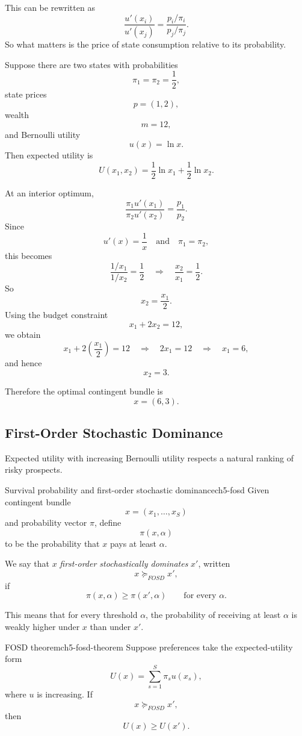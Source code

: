 This can be rewritten as
\[
\frac{u'(x_i)}{u'(x_j)} = \frac{p_i/\pi_i}{p_j/\pi_j}.
\]
So what matters is the price of state consumption relative to its probability.

\begin{examplebox}[title={Worked Example: optimal contingent consumption with logarithmic utility}]
Suppose there are two states with probabilities
\[
\pi_1=\pi_2=\frac12,
\]
state prices
\[
p=(1,2),
\]
wealth
\[
m=12,
\]
and Bernoulli utility
\[
u(x)=\ln x.
\]
Then expected utility is
\[
U(x_1,x_2)=\frac12 \ln x_1 + \frac12 \ln x_2.
\]

At an interior optimum,
\[
\frac{\pi_1 u'(x_1)}{\pi_2 u'(x_2)}=\frac{p_1}{p_2}.
\]
Since
\[
u'(x)=\frac{1}{x}
\quad \text{and} \quad
\pi_1=\pi_2,
\]
this becomes
\[
\frac{1/x_1}{1/x_2} = \frac{1}{2}
\quad \Longrightarrow \quad
\frac{x_2}{x_1}=\frac12.
\]
So
\[
x_2=\frac{x_1}{2}.
\]
Using the budget constraint
\[
x_1 + 2x_2 = 12,
\]
we obtain
\[
x_1 + 2\left(\frac{x_1}{2}\right)=12
\quad \Longrightarrow \quad
2x_1=12
\quad \Longrightarrow \quad
x_1=6,
\]
and hence
\[
x_2=3.
\]

Therefore the optimal contingent bundle is
\[
\boxed{x=(6,3).}
\]
\end{examplebox}

\subsection{First-Order Stochastic Dominance}

Expected utility with increasing Bernoulli utility respects a natural ranking of risky prospects.

\begin{definition}{Survival probability and first-order stochastic dominance}{ch5-fosd}
Given contingent bundle
\[
x=(x_1,\dots,x_S)
\]
and probability vector $\pi$, define
\[
\pi(x,\alpha)
\]
to be the probability that $x$ pays at least $\alpha$.

We say that $x$ \emph{first-order stochastically dominates} $x'$, written
\[
x \succeq_{FOSD} x',
\]
if
\[
\pi(x,\alpha) \ge \pi(x',\alpha)
\qquad \text{for every } \alpha.
\]
\end{definition}

This means that for every threshold $\alpha$, the probability of receiving at least $\alpha$ is weakly higher under $x$ than under $x'$.

\begin{theorem}{FOSD theorem}{ch5-fosd-theorem}
Suppose preferences take the expected-utility form
\[
U(x)=\sum_{s=1}^S \pi_s u(x_s),
\]
where $u$ is increasing. If
\[
x \succeq_{FOSD} x',
\]
then
\[
U(x)\ge U(x').
\]
\end{theorem}

